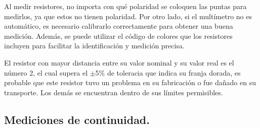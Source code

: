 \documentclass[10pt]{article}
\begin{document}
\begin{multicols}{2}
Al medir resistores, no importa con qué polaridad se coloquen las puntas para medirlos, ya que estos no tienen polaridad. Por otro lado, si el multímetro no es automático, es necesario calibrarlo correctamente para obtener una buena medición. Además, se puede utilizar el código de colores que los resistores incluyen para facilitar la identificación y medición precisa.

El resistor con mayor distancia entre su valor nominal y su valor real es el número 2, el cual supera el $\pm$5\% de toleracia que indica su franja dorada, es probable que este resistor tuvo un problema en su fabricación o fue dañado en su transporte. Los demás se encuentran dentro de sus límites permisibles.
\subsection{Mediciones de continuidad.}


\end{multicols}
\end{document}
